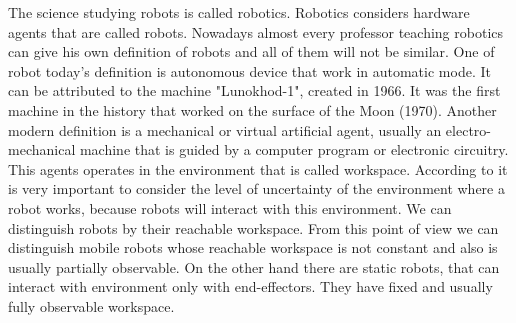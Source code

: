 \documentclass[12pt,a4paper]{report}
\begin{document}
		The science studying robots is called robotics. Robotics considers hardware agents that are called robots. 		Nowadays almost every professor teaching robotics can give his own definition of robots and all of them will not be similar. One of robot today's definition is autonomous device that work in automatic mode. It can be attributed to the machine "Lunokhod-1", created in 1966. It was the first machine in the history that worked on the surface of the Moon (1970). Another modern definition is a mechanical or virtual artificial agent, usually an electro-mechanical machine that is guided by a computer program or electronic circuitry. This agents operates in the environment that is called workspace. According to \cite{pfeifer2007self} it is very important to consider the level of uncertainty of the environment where a robot works, because robots will interact with this environment. We can distinguish robots by their reachable workspace. From this point of view we can distinguish mobile robots whose reachable workspace is not constant and also is usually partially observable. On the other hand there are static robots, that can interact with environment only with end-effectors. They have fixed and usually fully observable workspace. 
		
\end{document}
